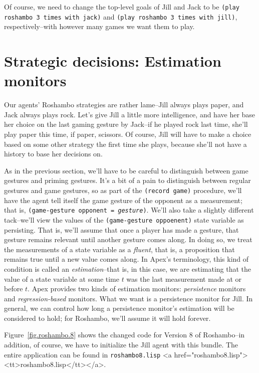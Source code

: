 \documentclass[12pt]{article}
\newcommand{\ic}{\texttt}
\newcommand{\firstref}{\textit}
\newcommand{\fn}[1]{\texonly\texttt{#1}\endtexonly
  \htmlonly \rawhtml <a href="#1"><tt>#1</tt></a>\endrawhtml \endhtmlonly}
\begin{document}
Of course, we need to change the top-level goals of Jill and Jack to be \ic{(play roshambo 3 times with jack)} and \ic{(play roshambo 3 times with jill)}, respectively--with however many games we want them to play.

\htmlpagebreak
\section{Strategic decisions: Estimation monitors}

Our agents' Roshambo strategies are rather lame--Jill always plays paper, and Jack always plays rock. Let's give Jill a little more intelligence, and have her base her choice on the last gaming gesture by Jack--if he played rock last time, she'll play paper this time, if paper, scissors. Of course, Jill will have to make a choice based on some other strategy the first time she plays, because she'll not have a history to base her decisions on.

As in the previous section, we'll have to be careful to distinguish between game gestures and priming gestures. It's a bit of a pain to distinguish between regular gestures and game gestures, so as part of the \ic{(record game)} procedure, we'll have the agent tell itself the game gesture of the opponent as a measurement; that is, \ic{(game-gesture opponent = \textit{gesture})}. We'll also  take a slightly different tack--we'll view the values of the \ic{(game-gesture oppoenent)} state variable as persisting. That is, we'll assume that once a player has made a gesture, that gesture remains relevant until another gesture comes along. In doing so, we treat the measurements of a state variable as a \firstref{fluent}, that is, a proposition that remains true until a new value comes along. In Apex's terminology, this kind of condition is called an \firstref{estimation}--that is, in this case, we are estimating that the value of a state variable at some time $t$ was the last measurement made at or before $t$. Apex provides two kinds of estimation monitors: \firstref{persistence} monitors and \firstref{regression-based} monitors. What we want is a persistence monitor for Jill. In general, we can control how long a persistence monitor's estimation will be considered to hold; for Roshambo, we'll assume it will hold forever. 

Figure~\ref{fig.roshambo.8} shows the changed code for Version 8 of Roshambo--in addition, of course, we have to initialize the Jill agent with this bundle. The entire application can be found in \fn{roshambo8.lisp}.
\end{document}
